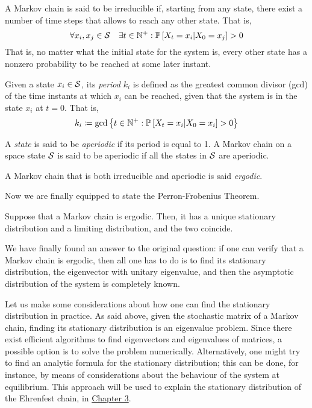 \begin{ndef} 
    A Markov chain is said to be irreducible if, starting from any state, there exist a number of time steps that allows to reach any other state. That is, 
    \begin{equation}
        \forall x_i, x_j \in \mathcal{S} \quad \exists t\in \mathbb{N}^+ : \mathbb{P}\left[X_t = x_i|X_0 = x_j\right] > 0
    \end{equation}
    That is, no matter what the initial state for the system is, every other state has a nonzero probability to be reached at some later instant.
\end{ndef}
\begin{ndef} 
    Given a state $x_i \in \mathcal{S}$, its \emph{period} $k_i$ is defined as the greatest common divisor (gcd) of the time instants at which $x_i$ can be reached, given that the system is in the state $x_i$ at $t=0$. That is,
    \begin{equation}
        k_i \coloneqq \text{gcd} \left\{ t\in \mathbb{N}^+ : \mathbb{P}\left[X_t = x_i | X_0 = x_i\right] > 0 \right\}
    \end{equation}
    
\end{ndef}
\begin{ndef} [Aperiodicity]
    A \emph{state} is said to be \emph{aperiodic} if its period is equal to 1. A Markov chain on a space state $\mathcal{S}$ is said to be aperiodic if all the states in $\mathcal{S}$ are aperiodic. 
\end{ndef}
\begin{ndef} [Ergodicity]
    A Markov chain that is both irreducible and aperiodic is said \emph{ergodic}.
\end{ndef}
Now we are finally equipped to state the Perron-Frobenius Theorem.

\begin{theorem} \label{th:perron-frobenius}
    Suppose that a Markov chain is ergodic. Then, it has a unique stationary distribution and a limiting distribution, and the two coincide.
\end{theorem}

\medskip
We have finally found an answer to the original question: if one can verify that a Markov chain is ergodic, then all one has to do is to find its stationary distribution, \ie the eigenvector with unitary eigenvalue, and then the asymptotic distribution of the system is completely known. 

Let us make some considerations about how one can find the stationary distribution in practice. As said above, given the stochastic matrix of a Markov chain, finding its stationary distribution is an eigenvalue problem. Since there exist efficient algorithms to find eigenvectors and eigenvalues of matrices, a possible option is to solve the problem numerically. Alternatively, one might try to find an analytic formula for the stationary distribution; this can be done, for instance, by means of considerations about the behaviour of the system at equilibrium. This approach will be used to explain the stationary distribution of the Ehrenfest chain, in \hyperref[ch:3]{Chapter 3}.


